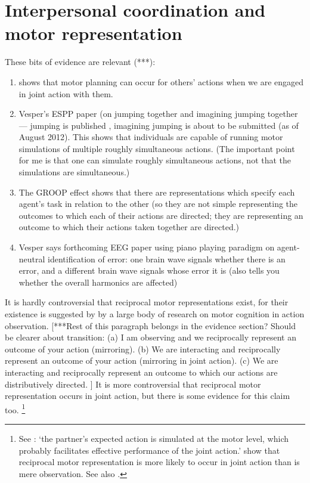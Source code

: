 \documentclass[12pt,\papersize]{extarticle}
\begin{document}
\section{Interpersonal coordination and motor representation}

These bits of evidence are relevant (***):
%
\begin{enumerate}

\item \citet{kourtis:2012_predictive} shows that motor planning can occur for others' actions when we are engaged in joint action with them.

\item Vesper's ESPP paper (on jumping together and imagining jumping together --- jumping is published \citep{vesper:2012_jumping}, imagining jumping is about to be submitted (as of August 2012).  This shows that individuals are capable of running motor simulations of multiple roughly simultaneous actions. 
(The important point for me is that one can simulate roughly simultaneous actions, not that the simulations are simultaneous.)

\item The GROOP effect shows that there are representations which specify each agent's task in relation to the other (so they are not simple representing the outcomes to which each of their actions are directed; they are representing an outcome to which their actions taken together are directed.)

\item Vesper says forthcoming EEG paper using piano playing paradigm on agent-neutral identification of error: one brain wave signals whether there is an error, and a different brain wave signals whose error it is (also tells you whether the overall harmonics are affected)
\end{enumerate}


It is hardly controversial that reciprocal motor representations exist, for their existence is suggested by by a large body of research on motor cognition in action observation.
[***Rest of this paragraph belongs in the evidence section?
Should be clearer about transition:
(a) I am observing and we reciprocally represent an outcome of your action (mirroring).
(b) We are interacting and reciprocally represent an outcome of your action (mirroring in joint action).
(c) We are interacting and reciprocally represent an outcome to which our actions are distributively directed.%
] 
It is more controversial that reciprocal motor representation occurs in joint action, but there is some evidence for this claim too.%
\footnote{
See \citet{kourtis:2012_predictive}: `the partner’s expected action is simulated at the motor level, which probably facilitates effective performance of the joint action.'
\citet{kourtis:2010_favoritism} show that 
reciprocal motor representation is more likely to occur in joint action than is mere observation. 
See also \citet{Knoblich:2003nf}.
 }
\end{document}
